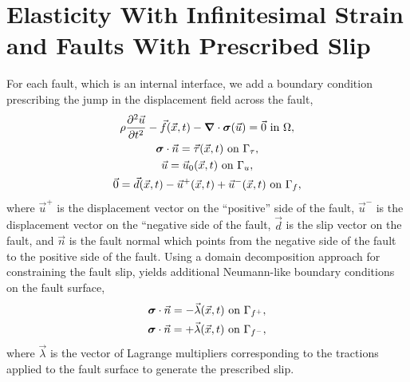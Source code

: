 \section{Elasticity With Infinitesimal Strain and Faults With Prescribed Slip}

For each fault, which is an internal interface, we add a boundary
condition prescribing the jump in the displacement field across the
fault,
\begin{gather}
  \rho \frac{\partial^2\vec{u}}{\partial t^2} - \vec{f}(\vec{x},t) - \tensor{\nabla} \cdot 
\tensor{\sigma}
(\vec{u}) = \vec{0} \text{ in }\Omega, \\
%
  \tensor{\sigma} \cdot \vec{n} = \vec{\tau}(\vec{x},t) \text{ on }\Gamma_\tau, \\
%
  \vec{u} = \vec{u}_0(\vec{x},t) \text{ on }\Gamma_u, \\
%
  \label{eqn:bc:prescribed_slip}
  \vec{0} = \vec{d}(\vec{x},t) - \vec{u}^+(\vec{x},t) + \vec{u}^-(\vec{x},t) \text{ on }\Gamma_f,
\end{gather}
where $\vec{u}^+$ is the displacement vector on the ``positive'' side
of the fault, $\vec{u}^-$ is the displacement vector on the ``negative
side of the fault, $\vec{d}$ is the slip vector on the fault, and
$\vec{n}$ is the fault normal which points from the negative side of
the fault to the positive side of the fault. Using a domain
decomposition approach for constraining the fault slip, yields
additional Neumann-like boundary conditions on the fault surface,
\begin{gather}
  \bm{\sigma} \cdot \vec{n} = -\vec{\lambda}(\vec{x},t) \text{ on }\Gamma_{f^+}, \\
  \bm{\sigma} \cdot \vec{n} = +\vec{\lambda}(\vec{x},t) \text{ on }\Gamma_{f^-},
\end{gather}
where $\vec{\lambda}$ is the vector of Lagrange multipliers
corresponding to the tractions applied to the fault surface to
generate the prescribed slip.

